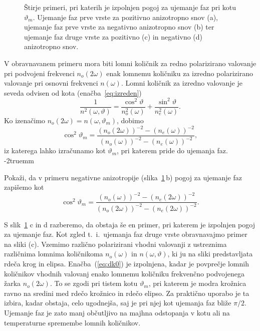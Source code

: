 \begin{figure}[h]
\centering
\def\svgwidth{140truemm} 

\caption{Štirje primeri, pri katerih je izpolnjen pogoj za ujemanje faz pri kotu $\vartheta_m$. 
Ujemanje faz prve vrste za pozitivno anizotropno snov (a), 
ujemanje faz prve vrste za negativno anizotropno snov (b) ter 
ujemanje faz druge vrste za pozitivno (c) in negativno (d) anizotropno snov.}
\label{fig:dk}
\end{figure}

V obravnavanem primeru mora biti lomni količnik za redno polarizirano valovanje pri 
podvojeni frekvenci $n_o(2\omega)$ enak lomnemu količniku za izredno 
polarizirano valovanje pri osnovni frekvenci $n(\omega)$. Lomni količnik
za izredno valovanje je seveda odvisen od kota (enačba~\ref{eq:izreden})
\begin{equation}
\frac{1}{n^2(\omega,\vartheta)}=
\frac{\cos^{2}\vartheta}{n_{o}^2(\omega)}+\frac{\sin^{2}\vartheta}{n_{e}^2(\omega)}.
\label{8.12}
\end{equation}
Ko izenačimo $n_o(2\omega) = n(\omega,\vartheta_m)$, dobimo
\begin{equation}
\cos^{2}\vartheta_m=\frac{(n_o(2\omega))^{-2}-(n_{e}(\omega))^{-2}}
{(n_{o}(\omega))^{-2}-(n_{e}(\omega))^{-2}},
\label{8.13}
\end{equation}
iz katerega lahko izračunamo kot $\vartheta_m$, pri katerem pride do ujemanja faz.
\vglue-2truemm
\begin{definition}
Pokaži, da v primeru negativne anizotropije (slika~\ref{fig:dk}\,b) 
pogoj za ujemanje faz zapišemo kot
\begin{equation}
\cos^{2}\vartheta_m=\frac{(n_o(\omega))^{-2}-(n_{e}(2\omega))^{-2}}
{(n_{o}(2\omega))^{-2}-(n_{e}(2\omega))^{-2}}.
\label{8.13a}
\end{equation}
\end{definition}

S slik~\ref{fig:dk} c in d razberemo, da obstaja še en primer, pri 
katerem je izpolnjen pogoj za ujemanje faz. Kot zgled t.\ i.\ ujemanja faz druge vrste
obravnavajmo primer na sliki (c).
Vzemimo različno polarizirani vhodni valovanji z ustreznima različnima lomnima
količnikoma $n_o(\omega)$ in $n(\omega,\vartheta)$, ki ju na sliki predstavljata
rdeča krog in elipsa.
Enačba~(\ref{eq:dk0}) je izpolnjena, kadar je povprečje lomnih količnikov
vhodnih valovanj  enako lomnemu količniku frekvenčno podvojenega žarka $n_o(2\omega)$. 
To se zgodi pri tistem kotu $\vartheta_m$, pri katerem je modra krožnica ravno na 
sredini med rdečo krožnico in rdečo elipso. Za praktično uporabo je ta izbira, kadar obstaja,
celo ugodnejša, saj je pri njej kot ujemanja faz bliže $\pi/2$. 
Ujemanje faz je zato manj občutljivo na majhna odstopanja v kotu ali na temperaturne
spremembe lomnih količnikov. 

